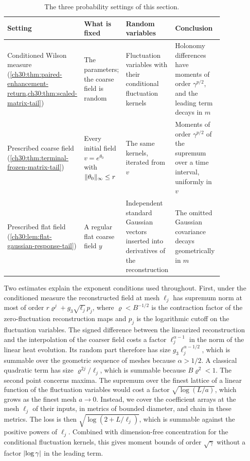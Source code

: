 \begin{table}[ht]
\centering\small
\begin{tabular}{p{0.2\linewidth}p{0.2\linewidth}p{0.21\linewidth}p{0.27\linewidth}}
\toprule
Setting & What is fixed & Random variables & Conclusion\\\midrule
Conditioned Wilson measure (\cref{ch30:thm:paired-enhancement-return,ch30:thm:scaled-matrix-tail}) & The parameters; the coarse field is random & Fluctuation variables with their conditional fluctuation kernels & Holonomy differences have moments of order $\gamma^{p/2}$, and the leading term decays in $m$\\[3pt]
Prescribed coarse field (\cref{ch30:thm:terminal-frozen-matrix-tail}) & Every initial field $v=e^{\theta_0}$ with $\lVert \theta_0\rVert_\infty\le r$ & The same kernels, iterated from $v$ & Moments of order $\gamma^{p/2}$ of the supremum over a time interval, uniformly in $v$\\[3pt]
Prescribed flat field (\cref{ch30:lem:flat-gaussian-response-tail}) & A regular flat coarse field $y$ & Independent standard Gaussian vectors inserted into derivatives of the reconstruction & The omitted Gaussian covariance decays geometrically in $m$\\
\bottomrule
\end{tabular}
\caption{The three probability settings of this section.}
\label{ch30:tab:settings}
\end{table}

Two estimates explain the exponent conditions used throughout. First, under the conditioned measure the reconstructed field at mesh $\ell_j$ has supremum norm at most of order $r\varrho^j+g_3\sqrt{\ell_j}\,p_j$, where $\varrho<B^{-1/2}$ is the contraction factor of the zero-fluctuation reconstruction maps and $p_j$ is the logarithmic cutoff on the fluctuation variables. The signed difference between the linearized reconstruction and the interpolation of the coarser field costs a factor $\ell_j^{\alpha-1}$ in the norm of the linear heat evolution. Its random part therefore has size $g_3\ell_j^{\alpha-1/2}$, which is summable over the geometric sequence of meshes because $\alpha>1/2$. A classical quadratic term has size $\varrho^{2j}/\ell_j$, which is summable because $B\varrho^2<1$. The second point concerns maxima. The supremum over the finest lattice of a linear function of the fluctuation variables would cost a factor $\sqrt{\log(L/a)}$, which grows as the finest mesh $a\to0$. Instead, we cover the coefficient arrays at the mesh $\ell_j$ of their inputs, in metrics of bounded diameter, and chain in these metrics. The loss is then $\sqrt{\log(2+L/\ell_j)}$, which is summable against the positive powers of $\ell_j$. Combined with dimension-free concentration for the conditional fluctuation kernels, this gives moment bounds of order $\sqrt\gamma$ without a factor $\lvert \log\gamma\rvert$ in the leading term.

